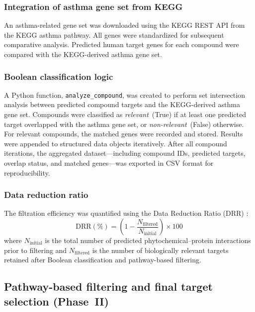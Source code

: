 \documentclass[11pt,a4paper]{article}
\begin{document}
\subsubsection{Integration of asthma gene set from KEGG}

An asthma-related gene set was downloaded using the KEGG REST API from the KEGG asthma pathway. All genes were standardized for subsequent comparative analysis. Predicted human target genes for each compound were compared with the KEGG-derived asthma gene set.

\subsubsection{Boolean classification logic}

A Python function, \texttt{analyze\_compound}, was created to perform set intersection analysis between predicted compound targets and the KEGG-derived asthma gene set. Compounds were classified as \emph{relevant}~(True) if at least one predicted target overlapped with the asthma gene set, or \emph{non-relevant}~(False) otherwise. For relevant compounds, the matched genes were recorded and stored. Results were appended to structured data objects iteratively. After all compound iterations, the aggregated dataset---including compound IDs, predicted targets, overlap status, and matched genes---was exported in CSV format for reproducibility.

\subsubsection{Data reduction ratio}

The filtration efficiency was quantified using the Data Reduction Ratio (DRR) \cite{awan2016}:
%
\begin{equation}
\text{DRR} (\%) = \left(1 - \frac{N_{\text{filtered}}}{N_{\text{initial}}}\right) \times 100
\label{eq:drr}
\end{equation}
%
where $N_{\text{initial}}$ is the total number of predicted phytochemical--protein interactions prior to filtering and $N_{\text{filtered}}$ is the number of biologically relevant targets retained after Boolean classification and pathway-based filtering.


\subsection{Pathway-based filtering and final target selection (Phase~II)}
\end{document}
